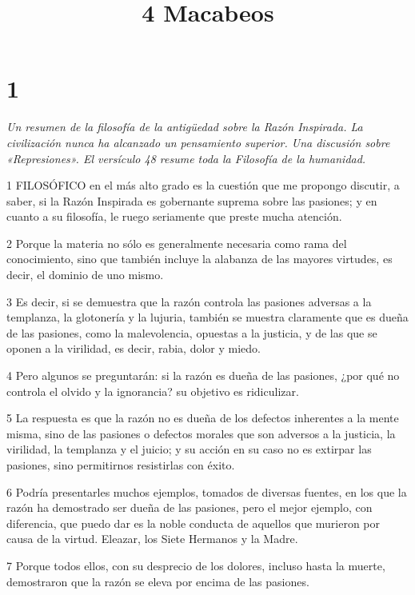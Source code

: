 

\title{4 Macabeos}

\chapter{1}

\par \textit{Un resumen de la filosofía de la antigüedad sobre la Razón Inspirada. La civilización nunca ha alcanzado un pensamiento superior. Una discusión sobre «Represiones». El versículo 48 resume toda la Filosofía de la humanidad.}

\par 1 FILOSÓFICO en el más alto grado es la cuestión que me propongo discutir, a saber, si la Razón Inspirada es gobernante suprema sobre las pasiones; y en cuanto a su filosofía, le ruego seriamente que preste mucha atención.

\par 2 Porque la materia no sólo es generalmente necesaria como rama del conocimiento, sino que también incluye la alabanza de las mayores virtudes, es decir, el dominio de uno mismo.

\par 3 Es decir, si se demuestra que la razón controla las pasiones adversas a la templanza, la glotonería y la lujuria, también se muestra claramente que es dueña de las pasiones, como la malevolencia, opuestas a la justicia, y de las que se oponen a la virilidad, es decir, rabia, dolor y miedo.

\par 4 Pero algunos se preguntarán: si la razón es dueña de las pasiones, ¿por qué no controla el olvido y la ignorancia? su objetivo es ridiculizar.

\par 5 La respuesta es que la razón no es dueña de los defectos inherentes a la mente misma, sino de las pasiones o defectos morales que son adversos a la justicia, la virilidad, la templanza y el juicio; y su acción en su caso no es extirpar las pasiones, sino permitirnos resistirlas con éxito.

\par 6 Podría presentarles muchos ejemplos, tomados de diversas fuentes, en los que la razón ha demostrado ser dueña de las pasiones, pero el mejor ejemplo, con diferencia, que puedo dar es la noble conducta de aquellos que murieron por causa de la virtud. Eleazar, los Siete Hermanos y la Madre.

\par 7 Porque todos ellos, con su desprecio de los dolores, incluso hasta la muerte, demostraron que la razón se eleva por encima de las pasiones.

